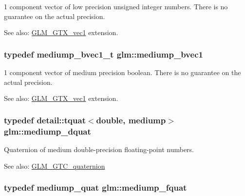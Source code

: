 1 component vector of low precision unsigned integer numbers. There is no guarantee on the actual precision. \begin{Desc}
\item[See also:]\hyperlink{group__gtx__vec1}{GLM\_\-GTX\_\-vec1} extension. \end{Desc}
\hypertarget{namespaceglm_6c2cab6a7010331621a5ce656dd5f58d}{
\subsubsection[mediump\_\-bvec1]{\setlength{\rightskip}{0pt plus 5cm}typedef mediump\_\-bvec1\_\-t {\bf glm::mediump\_\-bvec1}}}
\label{namespaceglm_6c2cab6a7010331621a5ce656dd5f58d}


1 component vector of medium precision boolean. There is no guarantee on the actual precision. \begin{Desc}
\item[See also:]\hyperlink{group__gtx__vec1}{GLM\_\-GTX\_\-vec1} extension. \end{Desc}
\hypertarget{namespaceglm_302e27293c89ef6128f4eb14ea06ec8b}{
\subsubsection[mediump\_\-dquat]{\setlength{\rightskip}{0pt plus 5cm}typedef detail::tquat$<$double, mediump$>$ {\bf glm::mediump\_\-dquat}}}
\label{namespaceglm_302e27293c89ef6128f4eb14ea06ec8b}


Quaternion of medium double-precision floating-point numbers.

\begin{Desc}
\item[See also:]\hyperlink{group__gtc__quaternion}{GLM\_\-GTC\_\-quaternion} \end{Desc}
\hypertarget{namespaceglm_154ae157e20a677e5663d97b923b1053}{
\subsubsection[mediump\_\-fquat]{\setlength{\rightskip}{0pt plus 5cm}typedef {\bf mediump\_\-quat} {\bf glm::mediump\_\-fquat}}}
\label{namespaceglm_154ae157e20a677e5663d97b923b1053}


